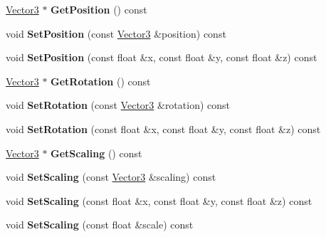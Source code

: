 \begin{DoxyCompactItemize}
\hyperlink{class_flounder_1_1_vector3}{Vector3} $\ast$ {\bfseries Get\+Position} () const
\item 
\mbox{\label{class_flounder_1_1_transform_a0d4d3c45fac56d7a3014e65779b938a2}} 
void {\bfseries Set\+Position} (const \hyperlink{class_flounder_1_1_vector3}{Vector3} \&position) const
\item 
\mbox{\label{class_flounder_1_1_transform_a5f1c5033b56dc573348e7ae8e1a3d216}} 
void {\bfseries Set\+Position} (const float \&x, const float \&y, const float \&z) const
\item 
\mbox{\label{class_flounder_1_1_transform_a46722d79d109352917ecdd887529c8b3}} 
\hyperlink{class_flounder_1_1_vector3}{Vector3} $\ast$ {\bfseries Get\+Rotation} () const
\item 
\mbox{\label{class_flounder_1_1_transform_a514e811e51a47070f3ff509cb7ac155a}} 
void {\bfseries Set\+Rotation} (const \hyperlink{class_flounder_1_1_vector3}{Vector3} \&rotation) const
\item 
\mbox{\label{class_flounder_1_1_transform_a1346366fcd50fcd3544902853f9ac086}} 
void {\bfseries Set\+Rotation} (const float \&x, const float \&y, const float \&z) const
\item 
\mbox{\label{class_flounder_1_1_transform_a3fa5bda5af51fb1475c789805e11c0db}} 
\hyperlink{class_flounder_1_1_vector3}{Vector3} $\ast$ {\bfseries Get\+Scaling} () const
\item 
\mbox{\label{class_flounder_1_1_transform_acfecd57f00761e39e0183f5a65737b6a}} 
void {\bfseries Set\+Scaling} (const \hyperlink{class_flounder_1_1_vector3}{Vector3} \&scaling) const
\item 
\mbox{\label{class_flounder_1_1_transform_a23c8f9c0da118a7edde442489bf28252}} 
void {\bfseries Set\+Scaling} (const float \&x, const float \&y, const float \&z) const
\item 
\mbox{\label{class_flounder_1_1_transform_a6c9e07785962fe0607733a5a47eae0f4}} 
void {\bfseries Set\+Scaling} (const float \&scale) const
\end{DoxyCompactItemize}
